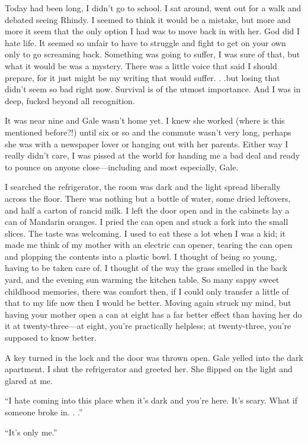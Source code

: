 Today had been long, I didn't go to school. I sat around, went out for a
walk and debated seeing Rhindy. I seemed to think it would be a mistake,
but more and more it seem that the only option I had was to move back in
with her. God did I hate life. It seemed so unfair to have to struggle
and fight to get on your own only to go screaming back. Something was
going to suffer, I was sure of that, but what it would be was a mystery.
There was a little voice that said I should prepare, for it just might
be my writing that would suffer. . .but losing that didn't seem so bad
right now. Survival is of the utmost importance. And I was in deep,
fucked beyond all recognition.

It was near nine and Gale wasn't home yet. I knew she worked (where is
this mentioned before?!) until six or so and the commute wasn't very
long, perhaps she was with a newspaper lover or hanging out with her
parents. Either way I really didn't care, I was pissed at the world for
handing me a bad deal and ready to pounce on anyone close---including
and most especially, Gale.

I searched the refrigerator, the room was dark and the light spread
liberally across the floor. There was nothing but a bottle of water,
some dried leftovers, and half a carton of rancid milk. I left the door
open and in the cabinets lay a can of Mandarin oranges. I pried the can
open and stuck a fork into the small slices. The taste was welcoming. I
used to eat these a lot when I was a kid; it made me think of my mother
with an electric can opener, tearing the can open and plopping the
contents into a plastic bowl. I thought of being so young, having to be
taken care of. I thought of the way the grass smelled in the back yard,
and the evening sun warming the kitchen table. So many sappy sweet
childhood memories, there was comfort then, if I could only transfer a
little of that to my life now then I would be better. Moving again
struck my mind, but having your mother open a can at eight has a far
better effect than having her do it at twenty-three---at eight, you're
practically helpless; at twenty-three, you're supposed to know better.

A key turned in the lock and the door was thrown open. Gale yelled into
the dark apartment. I shut the refrigerator and greeted her. She flipped
on the light and glared at me.

``I hate coming into this place when it's dark and you're here. It's
scary. What if someone broke in. . .''

``It's only me.''


